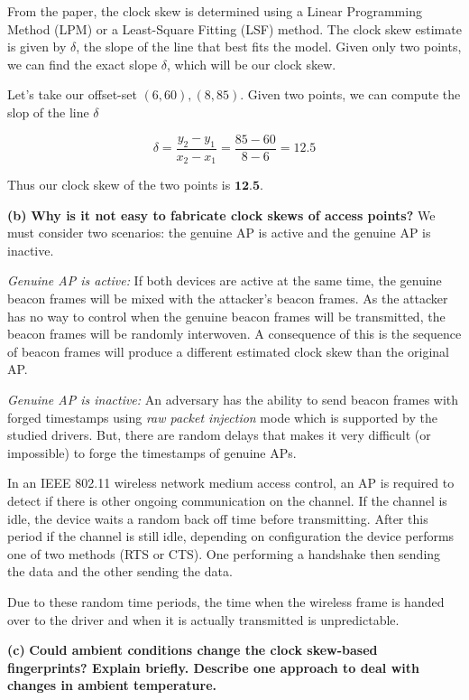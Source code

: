 \documentclass[11pt]{article}
\renewcommand\part[1]{\vspace{.10in}\textbf{(#1)}}
\begin{document}
From the paper, the clock skew is determined using a Linear Programming Method (LPM) or a Least-Square Fitting (LSF) method. The clock skew estimate is given by $\delta$, the slope of the line that best fits the model. Given only two points, we can find the exact slope $\delta$, which will be our clock skew.

Let's take our offset-set $(6, 60), (8, 85)$. Given two points, we can compute the slop of the line $\delta$

$$\delta = \frac{y_2 - y_1}{x_2 - x_1} = \frac{85 - 60}{8 - 6} = 12.5$$

Thus our clock skew of the two points is $\textbf{12.5}$.

\part{b} 
\textbf{Why is it not easy to fabricate clock skews of access points?}
We must consider two scenarios: the genuine AP is active and the genuine AP is inactive.

\textit{Genuine AP is active:} If both devices are active at the same time, the genuine beacon frames will be mixed with the attacker's beacon frames. As the attacker has no way to control when the genuine beacon frames will be transmitted, the beacon frames will be randomly interwoven. A consequence of this is the sequence of beacon frames will produce a different estimated clock skew than the original AP.

\textit{Genuine AP is inactive:} An adversary has the ability to send beacon frames with forged timestamps using \textit{raw packet injection} mode which is supported by the studied drivers. But, there are random delays that makes it very difficult (or impossible) to forge the timestamps of genuine APs.

In an IEEE 802.11 wireless network medium access control, an AP is required to detect if there is other ongoing communication on the channel. If the channel is idle, the device waits a random back off time before transmitting. After this period if the channel is still idle, depending on configuration the device performs one of two methods (RTS or CTS). One performing a handshake then sending the data and the other sending the data.

Due to these random time periods, the time when the wireless frame is handed over to the driver and when it is actually transmitted is unpredictable.

\part{c} \textbf{Could ambient conditions change the clock skew-based fingerprints? Explain briefly. Describe one approach to deal with changes in ambient temperature.}
\end{document}
